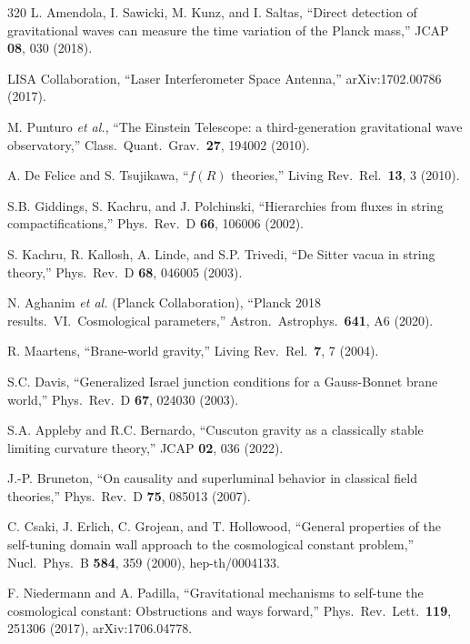 \begin{thebibliography}{320}
L. Amendola, I. Sawicki, M. Kunz, and I. Saltas,
``Direct detection of gravitational waves can measure the time variation of the Planck mass,''
JCAP \textbf{08}, 030 (2018).

LISA Collaboration,
``Laser Interferometer Space Antenna,''
arXiv:1702.00786 (2017).

M. Punturo \textit{et al.},
``The Einstein Telescope: a third-generation gravitational wave observatory,''
Class.\ Quant.\ Grav.\ \textbf{27}, 194002 (2010).

A. De Felice and S. Tsujikawa,
``$f(R)$ theories,''
Living Rev.\ Rel.\ \textbf{13}, 3 (2010).

S.B. Giddings, S. Kachru, and J. Polchinski,
``Hierarchies from fluxes in string compactifications,''
Phys.\ Rev.\ D \textbf{66}, 106006 (2002).

S. Kachru, R. Kallosh, A. Linde, and S.P. Trivedi,
``De Sitter vacua in string theory,''
Phys.\ Rev.\ D \textbf{68}, 046005 (2003).

N. Aghanim \textit{et al.} (Planck Collaboration),
``Planck 2018 results.\ VI.\ Cosmological parameters,''
Astron.\ Astrophys.\ \textbf{641}, A6 (2020).

R. Maartens,
``Brane-world gravity,''
Living Rev.\ Rel.\ \textbf{7}, 7 (2004).

S.C. Davis,
``Generalized Israel junction conditions for a Gauss-Bonnet brane world,''
Phys.\ Rev.\ D \textbf{67}, 024030 (2003).

S.A. Appleby and R.C. Bernardo,
``Cuscuton gravity as a classically stable limiting curvature theory,''
JCAP \textbf{02}, 036 (2022).

J.-P. Bruneton,
``On causality and superluminal behavior in classical field theories,''
Phys.\ Rev.\ D \textbf{75}, 085013 (2007).

C. Csaki, J. Erlich, C. Grojean, and T. Hollowood,
``General properties of the self-tuning domain wall approach to the cosmological constant problem,''
Nucl.\ Phys.\ B \textbf{584}, 359 (2000), hep-th/0004133.

F. Niedermann and A. Padilla,
``Gravitational mechanisms to self-tune the cosmological constant: Obstructions and ways forward,''
Phys.\ Rev.\ Lett.\ \textbf{119}, 251306 (2017), arXiv:1706.04778.


\end{thebibliography}
